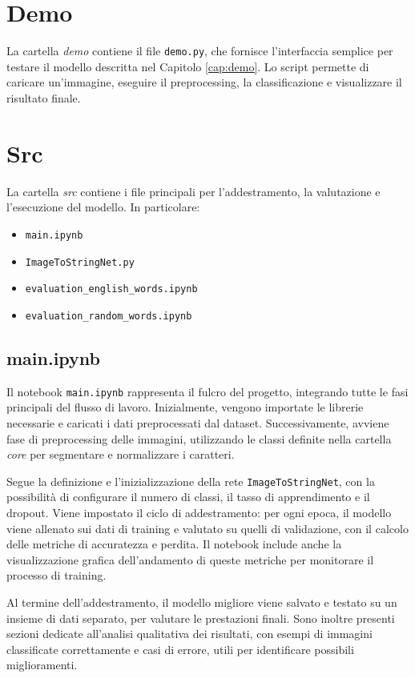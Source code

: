 \section{Demo}
La cartella \emph{demo} contiene il file \texttt{demo.py}, che fornisce l'interfaccia semplice per testare il modello descritta nel Capitolo \ref{cap:demo}. Lo script permette di caricare un'immagine, eseguire il preprocessing, la classificazione e visualizzare il risultato finale.
\section{Src}
La cartella \emph{src} contiene i file principali per l'addestramento, la valutazione e l'esecuzione del modello. In particolare:
\begin{itemize}
    \item \texttt{main.ipynb}
    \item \texttt{ImageToStringNet.py}
    \item \texttt{evaluation\_english\_words.ipynb}
    \item \texttt{evaluation\_random\_words.ipynb}
\end{itemize}

\subsection{main.ipynb}
Il notebook \texttt{main.ipynb} rappresenta il fulcro del progetto, integrando tutte le fasi principali del flusso di lavoro. Inizialmente, vengono importate le librerie necessarie e caricati i dati preprocessati dal dataset. Successivamente, avviene fase di preprocessing delle immagini, utilizzando le classi definite nella cartella \emph{core} per segmentare e normalizzare i caratteri. 

Segue la definizione e l'inizializzazione della rete \texttt{ImageToStringNet}, con la possibilità di configurare il numero di classi, il tasso di apprendimento e il dropout. Viene impostato il ciclo di addestramento: per ogni epoca, il modello viene allenato sui dati di training e valutato su quelli di validazione, con il calcolo delle metriche di accuratezza e perdita. Il notebook include anche la visualizzazione grafica dell'andamento di queste metriche per monitorare il processo di training.

Al termine dell'addestramento, il modello migliore viene salvato e testato su un insieme di dati separato, per valutare le prestazioni finali. Sono inoltre presenti sezioni dedicate all'analisi qualitativa dei risultati, con esempi di immagini classificate correttamente e casi di errore, utili per identificare possibili miglioramenti.

